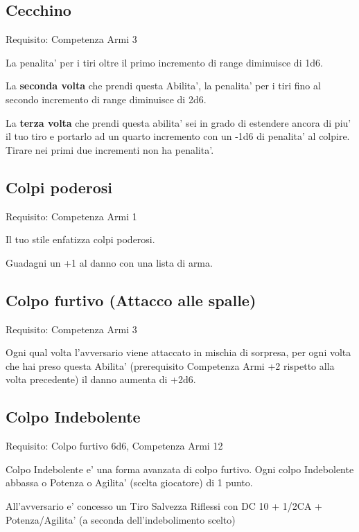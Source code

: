 \documentclass[a4paper,11pt,twoside,openany]{book}
\begin{document}
\subsection{Cecchino}

Requisito: Competenza Armi 3

La penalita' per i tiri oltre il primo incremento di range diminuisce
di 1d6.

La \textbf{seconda volta} che prendi questa Abilita', la penalita'
per i tiri fino al secondo incremento di range diminuisce di 2d6.

La \textbf{terza volta} che prendi questa abilita' sei in grado di
estendere ancora di piu' il tuo tiro e portarlo ad un quarto incremento
con un -1d6 di penalita' al colpire. Tirare nei primi due incrementi
non ha penalita'.

\subsection{Colpi poderosi}

Requisito: Competenza Armi 1

Il tuo stile enfatizza colpi poderosi.

Guadagni un +1 al danno con una lista di arma.

\subsection{Colpo furtivo (Attacco alle spalle)}

Requisito: Competenza Armi 3

Ogni qual volta l'avversario viene attaccato in mischia di sorpresa,
per ogni volta che hai preso questa Abilita' (prerequisito Competenza
Armi +2 rispetto alla volta precedente) il danno aumenta di +2d6.

\subsection{Colpo Indebolente}

Requisito: Colpo furtivo 6d6, Competenza Armi 12

Colpo Indebolente e' una forma avanzata di colpo furtivo. Ogni colpo
Indebolente abbassa o Potenza o Agilita' (scelta giocatore) di 1 punto.

All'avversario e' concesso un Tiro Salvezza Riflessi con DC 10 + 1/2CA + Potenza/Agilita' (a seconda dell'indebolimento scelto)
\end{document}

